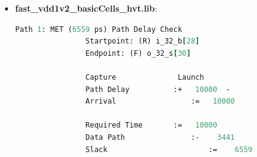 \begin{enumerate}[label=\arabic*.]
\begin{itemize}
			\begin{lstlisting}[style=StyleCode, language=TCL, caption={Delay .sdf file Using fast\_vdd1v2\_basicCells\_lvt.lib (\href{https://github.com/Noname-29-lnin/Floating_point/blob/main/Version_Final2/05_synth/Genus/fast_vdd1v2_basicCells_lvt/FPU_unit.sdf}{This link}).}]
				(DELAYFILE
					(SDFVERSION  "OVI 3.0")
					(DESIGN      "FPU_unit")
					(DATE        "Sun Nov 23 23:09:46 -0500 2025")
					(VENDOR      "Cadence, Inc.")
					(PROGRAM     "Genus(TM) Synthesis Solution")
					(VERSION     "GENUS15.20 - 15.20-p004_1")
					(DIVIDER     .)
					(VOLTAGE     ::1.32)
					(PROCESS     "::1.0")
					(TEMPERATURE ::0.0)
					(TIMESCALE   1ns)
					(CELL
					(CELLTYPE "OAI21X1LVT")
					(INSTANCE EXP_ADJUST_UNIT.CLA_8BIT_UNIT.CLA_4BIT_UNIT_0.g472)
						(DELAY
							(ABSOLUTE
								(PORT A0 (::0.000))
								(PORT A1 (::0.000))
								(PORT B0 (::0.000))
								(IOPATH A0 Y (::0.012) (::0.011))
								(IOPATH B0 Y (::0.007) (::0.010))
								(IOPATH A1 Y (::0.014) (::0.010))
							)
						)
					)
				...
				  	(CELL
					(CELLTYPE "OR2XLLVT")
					(INSTANCE g41)
						(DELAY
							(ABSOLUTE
								(PORT A (::0.000))
								(PORT B (::0.000))
								(IOPATH A Y (::0.010) (::0.016))
								(IOPATH B Y (::0.008) (::0.012))
							)
						)
					)
				)
			\end{lstlisting}
			
			\item \textbf{fast\_vdd1v2\_basicCells\_hvt.lib}:
			\begin{lstlisting}[style=StyleResult, language=TCL, caption={Timing Report Using fast\_vdd1v2\_basicCells\_hvt.lib (Worst-Case Corner).}]
				Path 1: MET (6559 ps) Path Delay Check
				Startpoint: (R) i_32_b[28]
				Endpoint: (F) o_32_s[30]
				
				Capture   			 Launch  
				Path Delay			:+   10000	-  
				Arrival					:=   10000            
				
				Required Time		:=   10000            
				Data Path				:-    3441            
				Slack						:=    6559            
			\end{lstlisting}
			

\end{itemize}
\end{enumerate}

